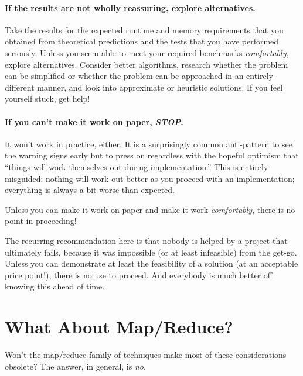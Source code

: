 \paragraph{If the results are not wholly reassuring, explore
alternatives.}\vspace*{3pt} Take the results for the expected runtime and
memory requirements that you obtained from theoretical predictions and the
tests that you have performed seriously. Unless you seem able to meet your
required benchmarks \emph{comfortably}, explore alternatives.  Consider better
algorithms, research whether the problem can be simplified or whether
the problem can be approached in an entirely different manner, and
look into approximate or heuristic solutions.  If you feel yourself
stuck, get help!

\paragraph{If you can't make it work on paper, \emph{STOP}.}
It won't work in practice, either.  It is a surprisingly common
anti-pattern to see the warning signs early but to press on regardless
with the hopeful optimism that ``things will work themselves out
during implementation.'' This is entirely misguided: nothing will work
out better as you proceed with an implementation; everything is always
a bit worse than expected.\vfill\pagebreak

Unless you can make it work on paper and make it work
\emph{comfortably}, there is no point in proceeding!

The recurring recommendation here is that nobody is helped by a
project that ultimately fails, because it was impossible (or at least
infeasible) from the get-go. Unless you can demonstrate at least the
feasibility of a solution (at an acceptable price point!), there is no
use to proceed. And everybody is much better off knowing this ahead of
time.


\vspace*{-6pt}
\section{What About Map/Reduce?}


Won't the map/reduce family of techniques make most of these
considerations obsolete? The answer, in general, is \emph{no}.

